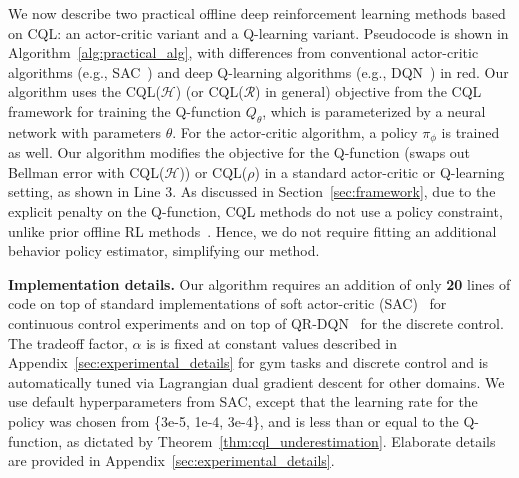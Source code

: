 We now describe two practical offline deep reinforcement learning methods based on CQL: an actor-critic variant and a Q-learning variant. Pseudocode is shown in Algorithm~\ref{alg:practical_alg}, with differences from conventional actor-critic algorithms (e.g., SAC~\citep{haarnoja}) and deep Q-learning algorithms (e.g., DQN~\citep{mnih2013playing}) in red.
Our algorithm uses the CQL($\mathcal{H}$) (or CQL($\mathcal{R}$) in general) objective from the CQL framework for training the Q-function $Q_\theta$, which is parameterized by a neural network with parameters $\theta$. For the actor-critic algorithm, a policy $\pi_\phi$ is trained as well. Our algorithm modifies the objective for the Q-function (swaps out Bellman error with CQL($\mathcal{H}$)) or CQL($\rho$)
in a standard actor-critic or Q-learning setting, as shown in Line 3. As discussed in Section~\ref{sec:framework}, due to the explicit penalty on the Q-function, CQL methods do not use a policy constraint,
unlike prior offline RL methods~\citep{kumar2019stabilizing,wu2019behavior,siegel2020keep,levine2020offline}.
Hence, we do not require fitting an additional behavior policy estimator, simplifying our method. %

\textbf{Implementation details.} Our algorithm requires an addition of only \textbf{20} lines of code on top of standard implementations of soft actor-critic (SAC)~\citep{haarnoja} for continuous control experiments and on top of QR-DQN~\citep{dabney2018distributional} for the discrete control. The tradeoff factor, $\alpha$
is is fixed at constant values described in Appendix~\ref{sec:experimental_details} for gym tasks and discrete control and is automatically tuned via Lagrangian dual gradient descent for other domains. We use default hyperparameters from SAC, except that the learning rate for the policy was chosen from \{3e-5, 1e-4, 3e-4\}, and is less than or equal to the Q-function, as dictated by Theorem~\ref{thm:cql_underestimation}. 
Elaborate details are provided in Appendix~\ref{sec:experimental_details}.  

\vspace{0.4cm}
